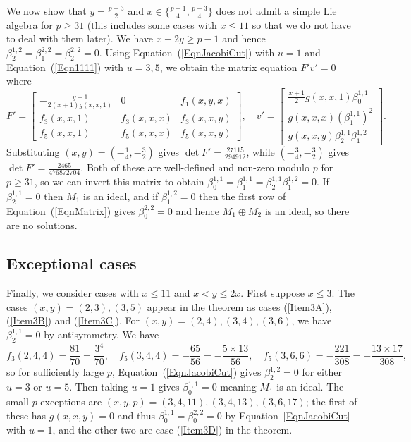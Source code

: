 \documentclass[11pt,a4paper,reqno]{amsart}
\theoremstyle{definition}
\numberwithin{equation}{section}
\begin{document}
We now show that $y=\frac{p-3}2$ and $x\in\{\frac{p-1}4,\frac{p-3}4\}$ does not admit a simple Lie algebra for $p\geq31$ (this includes some cases with $x\leq11$ so that we do not have to deal with them later). We have $x+2y\geq p-1$ and hence $\beta^{1,2}_2=\beta^{2,2}_1=\beta^{2,2}_2=0$. Using Equation~(\ref{EqnJacobiCut}) with $u=1$ and Equation~(\ref{Eqn1111}) with $u=3,5$, we obtain the matrix equation $F'v'=0$ where
\[F'=\begin{bmatrix}
-\frac{y+1}{2(x+1)g(x,x,1)}&0&f_1(x,y,x)\\
f_3(x,x,1) & f_3(x,x,x) & f_3(x,x,y)\\
f_5(x,x,1) & f_5(x,x,x) & f_5(x,x,y)
\end{bmatrix},\quad 
v'=\begin{bmatrix} \frac{x+1}2g(x,x,1)\beta^{1,1}_0 \\ g(x,x,x)(\beta^{1,1}_1)^2 \\ g(x,x,y)\beta^{1,1}_2\beta^{1,2}_1 \end{bmatrix}.\]
Substituting $(x,y)=(-\frac14,-\frac32)$ gives $\det F'=\frac{27115}{294912}$, while $(-\frac34,-\frac32)$ gives $\det F'=\frac{2465}{476872704}$. Both of these are well-defined and non-zero modulo $p$ for $p\geq31$, so we can invert this matrix to obtain $\beta^{1,1}_0=\beta^{1,1}_1=\beta^{1,1}_2\beta^{1,2}_1=0$. If $\beta^{1,1}_2=0$ then $M_1$ is an ideal, and if $\beta^{1,2}_1=0$ then the first row of Equation~(\ref{EqnMatrix}) gives $\beta^{2,2}_0=0$ and hence $M_1\oplus M_2$ is an ideal, so there are no solutions.


\subsection{Exceptional cases}\label{SecExceptions} Finally, we consider cases with $x\leq 11$ and $x<y\leq2x$. First suppose $x\leq 3$. The cases $(x,y)=(2,3),(3,5)$ appear in the theorem as cases (\ref{Item3A}), (\ref{Item3B}) and (\ref{Item3C}). For $(x,y)=(2,4),(3,4),(3,6)$, we have $\beta^{1,1}_2=0$ by antisymmetry. We have
\[\textstyle f_3(2,4,4)=\frac{81}{70}=\frac{3^4}{70},\quad f_5(3,4,4)=-\frac{65}{56}=-\frac{5\times13}{56},\quad f_5(3,6,6)=-\frac{221}{308}=-\frac{13\times17}{308},\]
so for sufficiently large $p$, Equation~(\ref{EqnJacobiCut}) gives $\beta^{1,2}_2=0$ for either $u=3$ or $u=5$. Then taking $u=1$ gives $\beta^{1,1}_0=0$ meaning $M_1$ is an ideal. The small $p$ exceptions are $(x,y,p)=(3,4,11),(3,4,13),(3,6,17)$; the first of these has $g(x,x,y)=0$ and thus $\beta^{1,1}_0=\beta^{2,2}_0=0$ by Equation~\ref{EqnJacobiCut} with $u=1$, and the other two are case (\ref{Item3D}) in the theorem.
\end{document}
